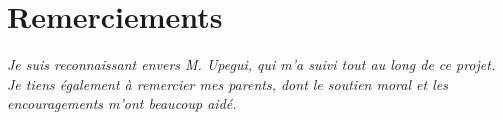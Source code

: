 \chapter*{Remerciements} %

\textit{Je suis reconnaissant envers M. Upegui, qui m'a suivi tout au long de ce projet. 
Je tiens également à remercier mes parents, dont le soutien moral et les encouragements m'ont beaucoup aidé.}
